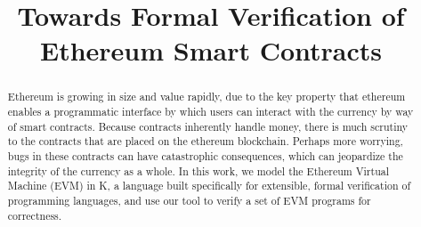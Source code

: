 \documentclass{llncs}
\begin{document}
\thispagestyle{empty}

\title{Towards Formal Verification of Ethereum  Smart Contracts}




\maketitle
\begin{abstract}
Ethereum is growing in size and value rapidly, due to the key property that
ethereum enables a programmatic interface by which users can interact with the
currency by way of smart contracts. Because contracts inherently handle money, there
is much scrutiny to the contracts that are placed on the ethereum blockchain.
Perhaps more worrying, bugs in these contracts can have catastrophic
consequences, which can jeopardize the integrity of the currency as a whole.
In this work, we model the Ethereum Virtual Machine (EVM) in K, a language built
specifically for extensible, formal verification of programming languages, and
use our tool to verify a set of EVM programs for correctness.
\end{abstract}
% 










\small

\nocite{*}
\end{document}
